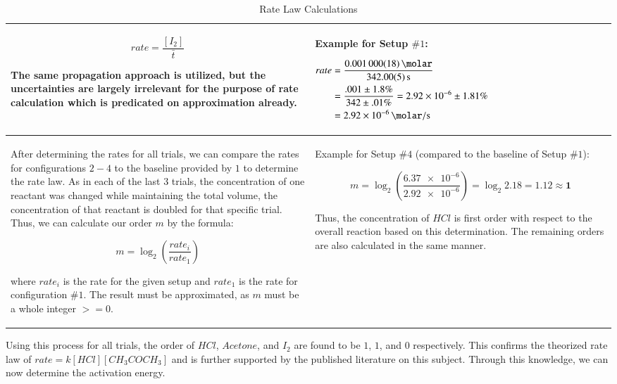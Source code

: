 \begin{table}[h!]
\begin{tabularx}{\textwidth}{|X|X|}
\[rate = \frac{[I_2]}{\bar{t}}\]

The same propagation approach is utilized, but the uncertainties are largely irrelevant for the purpose of rate calculation which is predicated on approximation already.
&
Example for Setup $\# 1$: \newline

	{$\!\begin{aligned}
	rate &= \frac{\SI{.001 \pm .000018}{\molar}}{\SI{342 \pm .05}{\second}} \\
	&= \frac{.001 \pm 1.8\%}{342 \pm .01\%} = \num{2.92e-6} \pm 1.81\% \\
	&= \SI{2.92e-6}{\molar\per\second}
	\end{aligned}$} \\

  \hline
After determining the rates for all trials, we can compare the rates for configurations $2-4$ to the baseline provided by $1$ to determine the rate law. As in each of the last $3$ trials, the concentration of one reactant was changed while maintaining the total volume, the concentration of that reactant is doubled for that specific trial. Thus, we can calculate our order $m$ by the formula:

\[m = \log_2 \left(\frac{rate_i}{rate_1}\right)\]

where $rate_i$ is the rate for the given setup and $rate_1$ is the rate for configuration $\#1$. The result must be approximated, as $m$ must be a whole integer $>=0$.
&
Example for Setup $\# 4$ (compared to the baseline of Setup $\# 1$):

	\[m = \log_2 \left(\frac{\num{6.37e-6}}{\num{2.92e-6}}\right) = \log_2 2.18 = 1.12 \approx \bm{1}\]

Thus, the concentration of $HCl$ is first order with respect to the overall reaction based on this determination. The remaining orders are also calculated in the same manner. \\

\hline

\end{tabularx}
\caption{Rate Law Calculations}
\label{table:rate_law_calculations}
\end{table}

Using this process for all trials, the order of $HCl$, $Acetone$, and $I_2$ are found to be $1$, $1$, and $0$ respectively. This confirms the theorized rate law of $rate = k[HCl][CH_3COCH_3]$ and is further supported by the published literature on this subject. Through this knowledge, we can now determine the activation energy.
\newpage

